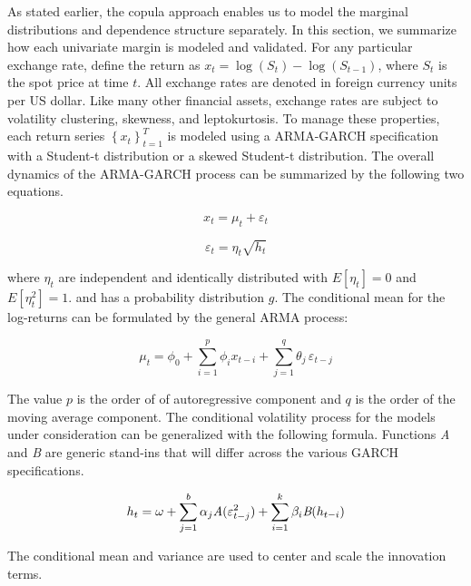 As stated earlier, the copula approach enables us to model the marginal distributions and dependence structure separately. In this section, we summarize how each univariate margin is modeled and validated. For any particular exchange rate, define the return as $x_{t} = \log \left(S_{t}\right) - \log\left(S_{t-1}\right)$, where $S_{t}$ is the spot price at time $t$. All exchange rates are denoted in foreign currency units per US dollar. Like many other financial assets, exchange rates are subject to volatility clustering, skewness, and leptokurtosis. To manage these properties, each return series $\left\{x_{t}\right\}_{t=1}^{T}$ is modeled using a ARMA-GARCH specification with a Student-t distribution or a skewed Student-t distribution. The overall dynamics of the ARMA-GARCH process can be summarized by the following two equations.

\begin{equation} \label{eqn:marginalModel}
    x_{t} = \mu_{t} + \varepsilon_{t}
\end{equation}

\begin{equation}
	\varepsilon_{t} = \eta_{t} \sqrt{h_{t}}
\end{equation}

where $\eta_{t}$ are independent and identically distributed with $E[\eta_{t}] = 0$ and $E[\eta^{2}_{t}] = 1$. and has a probability distribution $g$. The conditional mean for the log-returns can be formulated by the general ARMA process:

\begin{equation} \label{eq:conditional_mean}
    \mu_{t} = \phi_{0} + \sum_{i=1}^{p} \phi_{i} x_{t-i} + \sum_{j=1}^{q} \theta_{j} \, \varepsilon_{t - j}
\end{equation}

 The value $p$ is the order of of autoregressive component and $q$ is the order of the moving average component. The conditional volatility process for the models under consideration can be generalized with the following formula. Functions \emph{A} and \emph{B} are generic stand-ins that will differ across the various GARCH specifications.

\begin{equation} \label{eq:conditional_var}
    h_{t} = \omega + \sum_{j=1}^{b} \alpha_{j} \emph{A}(\varepsilon^{2}_{t - j}) + \sum_{i=1}^{k} \beta_{i} \emph{B}(h_{t - i})
\end{equation}

The conditional mean and variance are used to center and scale the innovation terms.

